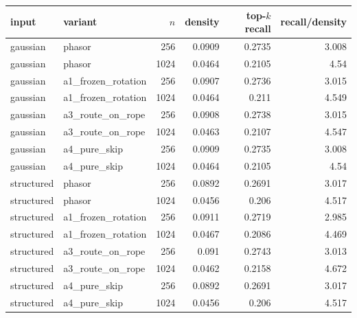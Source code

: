 \begin{tabular}{llrrrr}
\toprule
input & variant & $n$ & density & top-$k$ recall & recall/density \\
\midrule
gaussian & phasor & 256 & 0.0909 & 0.2735 & 3.008 \\
gaussian & phasor & 1024 & 0.0464 & 0.2105 & 4.54 \\
gaussian & a1\_frozen\_rotation & 256 & 0.0907 & 0.2736 & 3.015 \\
gaussian & a1\_frozen\_rotation & 1024 & 0.0464 & 0.211 & 4.549 \\
gaussian & a3\_route\_on\_rope & 256 & 0.0908 & 0.2738 & 3.015 \\
gaussian & a3\_route\_on\_rope & 1024 & 0.0463 & 0.2107 & 4.547 \\
gaussian & a4\_pure\_skip & 256 & 0.0909 & 0.2735 & 3.008 \\
gaussian & a4\_pure\_skip & 1024 & 0.0464 & 0.2105 & 4.54 \\
structured & phasor & 256 & 0.0892 & 0.2691 & 3.017 \\
structured & phasor & 1024 & 0.0456 & 0.206 & 4.517 \\
structured & a1\_frozen\_rotation & 256 & 0.0911 & 0.2719 & 2.985 \\
structured & a1\_frozen\_rotation & 1024 & 0.0467 & 0.2086 & 4.469 \\
structured & a3\_route\_on\_rope & 256 & 0.091 & 0.2743 & 3.013 \\
structured & a3\_route\_on\_rope & 1024 & 0.0462 & 0.2158 & 4.672 \\
structured & a4\_pure\_skip & 256 & 0.0892 & 0.2691 & 3.017 \\
structured & a4\_pure\_skip & 1024 & 0.0456 & 0.206 & 4.517 \\
\bottomrule
\end{tabular}